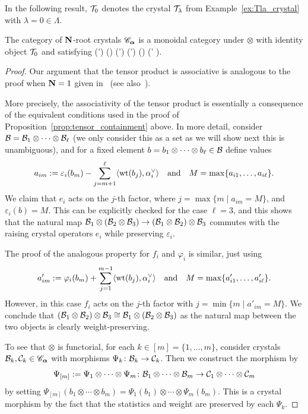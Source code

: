 \documentclass[11pt]{article}
\begin{document}
In the following result, $\mathcal{T}_0$ denotes the crystal $\mathcal{T}_\lambda$ from Example~\ref{ex:Tla_crystal} with $\lambda =0 \in \Lambda$.

\begin{proposition}
\label{prop:monoidal_cat}
The category of $\mathbf{N}$-root crystals $\mathscr{C}_{\boldsymbol{\alpha}}$ is a monoidal category under $\otimes$ with identity object $\mathcal{T}_0$ and satisfying
\be\label{eq:tensor_sum_rel}
\cB \otimes (\cC \oplus \cC') \iso (\cB \otimes \cC) \oplus (\cB \otimes \cC')
\quand
(\cB \oplus \cB') \otimes \cC \iso (\cB \otimes \cC) \oplus (\cB' \otimes \cC).
\ee
\end{proposition}

\begin{proof}
Our argument that the tensor product is associative is analogous to the proof when $\mathbf{N} = 1$ given in~\cite[Prop.~2.32]{BumpSchilling} (see also~\cite[Prop.~1.3.1, Ex.~1.3.4]{Kashiwara93}).

More precisely, the associativity of the tensor product is essentially a consequence of the equivalent conditions used in the proof of Proposition~\ref{prop:tensor_containment} above.
In more detail, consider $\mathcal{B} = \mathcal{B}_1 \otimes \cdots \otimes \mathcal{B}_{\ell}$ (we only consider this as a set as we will show next this is unambiguous), and for a fixed element $b = b_1 \otimes \cdots \otimes b_{\ell} \in \mathcal{B}$ define values
\[
a_{im} := \varepsilon_i(b_m) - \sum_{j=m+1}^{\ell} \langle \operatorname{wt}(b_j), \alpha_i^{\vee} \rangle
\quad\text{and}\quad
M = \max\{ a_{i1}, \dotsc, a_{i\ell} \}.
\]
We claim that $e_i$ acts on the $j$-th factor, where $j = \max \{m \mid a_{im} = M\}$, and $\varepsilon_i(b) = M$.
This can be explicitly checked for the case $\ell = 3$, and this shows that the natural map $\mathcal{B}_1 \otimes (\mathcal{B}_2 \otimes \mathcal{B}_3) \to (\mathcal{B}_1\otimes \mathcal{B}_2)\otimes \mathcal{B}_3$ commutes with the raising crystal operators $e_i$ while preserving $\varepsilon_i$. 

The proof of the analogous property for $f_i$ and $\varphi_i$ is similar, just using
\[
a'_{im} := \varphi_i(b_m) + \sum_{j=1}^{m-1} \langle \operatorname{wt}(b_j), \alpha_i^{\vee} \rangle
\quad\text{and}\quad
M = \max\{ a'_{i1}, \dotsc, a'_{i\ell} \}.
\]
However, in this case $f_i$ acts on the $j$-th factor with $j = \min \{m \mid a'_{im} = M\}$.
We conclude that
$
(\mathcal{B}_1 \otimes \mathcal{B}_2) \otimes \mathcal{B}_3 \cong \mathcal{B}_1 \otimes (\mathcal{B}_2 \otimes \mathcal{B}_3)
$
as the natural map between the two objects is clearly weight-preserving.

To see that $\otimes$ is functorial, for each $k \in [m] = \{1, \dotsc, m\}$, consider crystals $\mathcal{B}_k, \mathcal{C}_k \in \mathscr{C}_{\boldsymbol{\alpha}}$ with morphisms $\Psi_k \colon \mathcal{B}_k \to \mathcal{C}_k$.
Then we construct the morphism by
\[
\Psi_{[m]} := \Psi_1 \otimes \cdots \otimes \Psi_m \colon \mathcal{B}_1 \otimes \cdots \otimes \mathcal{B}_m \to \mathcal{C}_1 \otimes \cdots \otimes \mathcal{C}_m
\]
by setting
$\Psi_{[m]}(b_1 \otimes \cdots \otimes b_m) = \Psi_1(b_1) \otimes \cdots \otimes \Psi_m(b_m)$.
This is a crystal morphism by the fact that the statistics and weight are preserved by each $\Psi_k$.


\end{proof}
\end{document}
